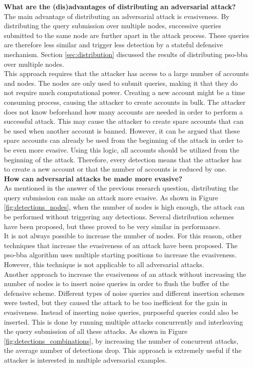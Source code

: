 \textbf{What are the (dis)advantages of distributing an adversarial attack?}\\
The main advantage of distributing an adversarial attack is evasiveness. By distributing the query submission over multiple nodes, successive queries submitted to the same node are further apart in the attack process. These queries are therefore less similar and trigger less detection by a stateful defensive mechanism. Section \ref{sec:distribution} discussed the results of distributing \gls{pso}-\gls{bba} over multiple nodes. \\

This approach requires that the attacker has access to a large number of accounts and nodes. The nodes are only used to submit queries, making it that they do not require much computational power. Creating a new account might be a time consuming process, causing the attacker to create  accounts in bulk. The attacker does not know beforehand how many accounts are needed in order to perform a successful attack. This may cause the attacker to create spare accounts that can be used when another account is banned. However, it can be argued that these spare accounts can already be used from the beginning of the attack in order to be even more evasive. Using this logic, all accounts should be utilized from the beginning of the attack. Therefore, every detection means that the attacker has to create a new account or that the number of accounts is reduced by one.\\  

\textbf{How can adversarial attacks be made more evasive?}\\
As mentioned in the answer of the previous research question, distributing the query submission can make an attack more evasive. As shown in Figure \ref{fig:detections_nodes}, when the number of nodes is high enough, the attack can be performed without triggering any detections. Several distribution schemes have been proposed, but these proved to be very similar in performance.\\

It is not always possible to increase the number of nodes. For this reason, other techniques that increase the evasiveness of an attack have been proposed. The \gls{pso}-\gls{bba} algorithm uses multiple starting positions to increase the evasiveness. However, this technique is not applicable to all adversarial attacks.\\

Another approach to increase the evasiveness of an attack without increasing the number of nodes is to insert noise queries in order to flush the buffer of the defensive scheme. Different types of noise queries and different insertion schemes were tested, but they caused the attack to be too inefficient for the gain in evasiveness. Instead of inserting noise queries, purposeful queries could also be inserted. This is done by running multiple attacks concurrently and interleaving the query submission of all these attacks. As shown in Figure \ref{fig:detections_combinations}, by increasing the number of concurrent attacks, the average number of detections drop. This approach is extremely useful if the attacker is interested in multiple adversarial examples.\\ 